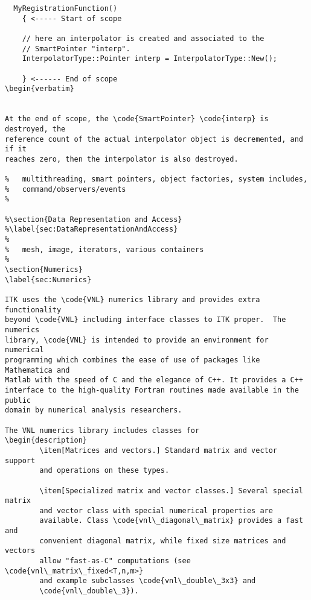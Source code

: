 \begin{verbatim}
  MyRegistrationFunction()
    { <----- Start of scope

    // here an interpolator is created and associated to the
    // SmartPointer "interp".
    InterpolatorType::Pointer interp = InterpolatorType::New();

    } <------ End of scope
\begin{verbatim}


At the end of scope, the \code{SmartPointer} \code{interp} is destroyed, the
reference count of the actual interpolator object is decremented, and if it
reaches zero, then the interpolator is also destroyed.

%	multithreading, smart pointers, object factories, system includes,
%	command/observers/events
%

%\section{Data Representation and Access}
%\label{sec:DataRepresentationAndAccess}
%
%	mesh, image, iterators, various containers
%
\section{Numerics}
\label{sec:Numerics}

ITK uses the \code{VNL} numerics library and provides extra functionality
beyond \code{VNL} including interface classes to ITK proper.  The numerics
library, \code{VNL} is intended to provide an environment for numerical
programming which combines the ease of use of packages like Mathematica and
Matlab with the speed of C and the elegance of C++. It provides a C++
interface to the high-quality Fortran routines made available in the public
domain by numerical analysis researchers.

The VNL numerics library includes classes for 
\begin{description}
        \item[Matrices and vectors.] Standard matrix and vector support
        and operations on these types.

        \item[Specialized matrix and vector classes.] Several special matrix
        and vector class with special numerical properties are
        available. Class \code{vnl\_diagonal\_matrix} provides a fast and
        convenient diagonal matrix, while fixed size matrices and vectors
        allow "fast-as-C" computations (see \code{vnl\_matrix\_fixed<T,n,m>} 
        and example subclasses \code{vnl\_double\_3x3} and 
        \code{vnl\_double\_3}).


\end{verbatim}
